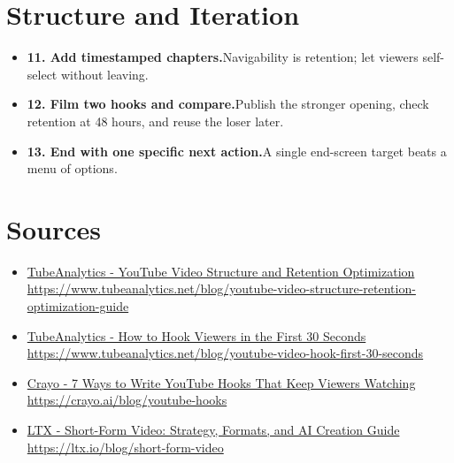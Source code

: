 \documentclass[11pt]{article}
\newcommand{\tip}[2]{\item \textbf{#1.}\enspace #2}
\newcommand{\tlabel}{\textcolor{accent}{\small$\blacktriangleright$}}
\begin{document}
\section*{Structure and Iteration}
\begin{itemize}[label=\tlabel]
\tip{11. Add timestamped chapters}{Navigability is retention; let viewers self-select without leaving.}
\tip{12. Film two hooks and compare}{Publish the stronger opening, check retention at 48 hours, and reuse the loser later.}
\tip{13. End with one specific next action}{A single end-screen target beats a menu of options.}
\end{itemize}
\section*{Sources}
\begin{itemize}[label={},leftmargin=0.9em,itemsep=1pt]
\footnotesize
\item \href{https://www.tubeanalytics.net/blog/youtube-video-structure-retention-optimization-guide}{TubeAnalytics - YouTube Video Structure and Retention Optimization} \\ {\color{softgray}\url{https://www.tubeanalytics.net/blog/youtube-video-structure-retention-optimization-guide}}
\item \href{https://www.tubeanalytics.net/blog/youtube-video-hook-first-30-seconds}{TubeAnalytics - How to Hook Viewers in the First 30 Seconds} \\ {\color{softgray}\url{https://www.tubeanalytics.net/blog/youtube-video-hook-first-30-seconds}}
\item \href{https://crayo.ai/blog/youtube-hooks}{Crayo - 7 Ways to Write YouTube Hooks That Keep Viewers Watching} \\ {\color{softgray}\url{https://crayo.ai/blog/youtube-hooks}}
\item \href{https://ltx.io/blog/short-form-video}{LTX - Short-Form Video: Strategy, Formats, and AI Creation Guide} \\ {\color{softgray}\url{https://ltx.io/blog/short-form-video}}
\end{itemize}
\normalsize
\end{document}
